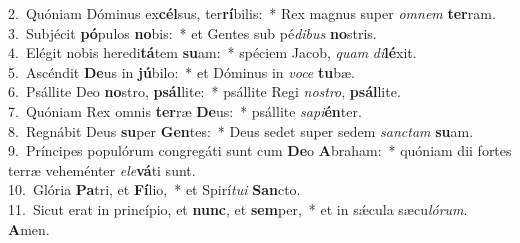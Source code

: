 {2.~}Quóniam Dóminus ex\textbf{cél}sus, ter\textbf{rí}bilis:~* Rex magnus super \textit{om}\textit{nem} \textbf{ter}ram.\\
{3.~}Subjécit \textbf{pó}pulos \textbf{no}bis:~* et Gentes sub pé\textit{di}\textit{bus} \textbf{no}stris.\\
{4.~}Elégit nobis heredi\textbf{tá}tem \textbf{su}am:~* spéciem Jacob, \textit{quam} \textit{di}\textbf{lé}xit.\\
{5.~}Ascéndit \textbf{De}us in \textbf{jú}bilo:~* et Dóminus in \textit{vo}\textit{ce} \textbf{tu}bæ.\\
{6.~}Psállite Deo \textbf{no}stro, \textbf{psál}lite:~* psállite Regi \textit{no}\textit{stro}, \textbf{psál}lite.\\
{7.~}Quóniam Rex omnis \textbf{ter}ræ \textbf{De}us:~* psállite \textit{sa}\textit{pi}\textbf{én}ter.\\
{8.~}Regnábit Deus \textbf{su}per \textbf{Gen}tes:~* Deus sedet super sedem \textit{san}\textit{ctam} \textbf{su}am.\\
{9.~}Príncipes populórum congregáti sunt cum \textbf{De}o \textbf{A}braham:~* quóniam dii fortes terræ veheménter \textit{e}\textit{le}\textbf{vá}ti sunt.\\
{10.~}Glória \textbf{Pa}tri, et \textbf{Fí}lio,~* et Spirí\textit{tu}\textit{i} \textbf{San}cto.\\
{11.~}Sicut erat in princípio, et \textbf{nunc}, et \textbf{sem}per,~* et in sǽcula sæcu\textit{ló}\textit{rum}. \textbf{A}men.\\
